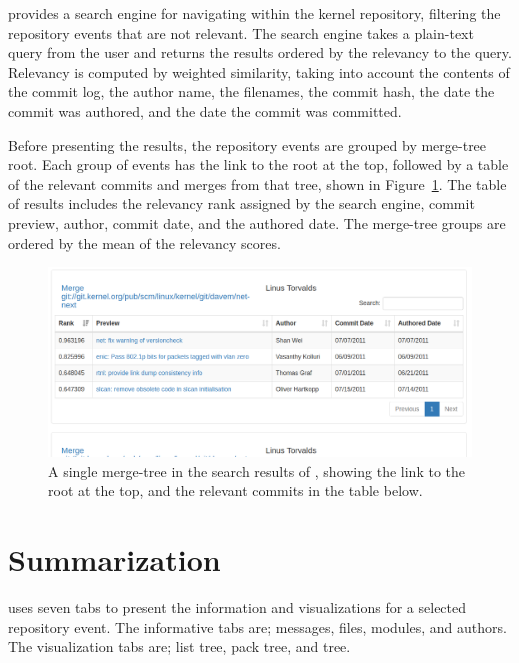 
\tool{} provides a search engine for navigating within the kernel
repository, filtering the repository events that are not relevant. The
search engine takes a plain-text query from the user and returns the
results ordered by the relevancy to the query. Relevancy is computed by
weighted similarity, taking into account the contents of the commit log,
the author name, the filenames, the commit hash, the date the commit was
authored, and the date the commit was committed.

Before presenting the results, the repository events are grouped by
merge-tree root. Each group of events has the link to the root at the
top, followed by a table of the relevant commits and merges from that
tree, shown in Figure~\ref{fig:linvis_search_results}. The table of
results includes the relevancy rank assigned by the search engine,
commit preview, author, commit date, and the authored date. The
merge-tree groups are ordered by the mean of the relevancy scores.

\begin{figure}[htpb]
  \centering
  \includegraphics[width=0.9\linewidth]{Figures/Linvis/search_results.png}
  \caption{A single merge-tree in the search results of \tool{}, showing
    the link to the root at the top, and the relevant commits in the
    table below.}
  \label{fig:linvis_search_results}
\end{figure}

\section{Summarization}\label{sec:summarization}

\tool{} uses seven tabs to present the information and visualizations
for a selected repository event. The informative tabs are; messages,
files, modules, and authors. The visualization tabs are; list tree, pack
tree, and \rt{} tree.

